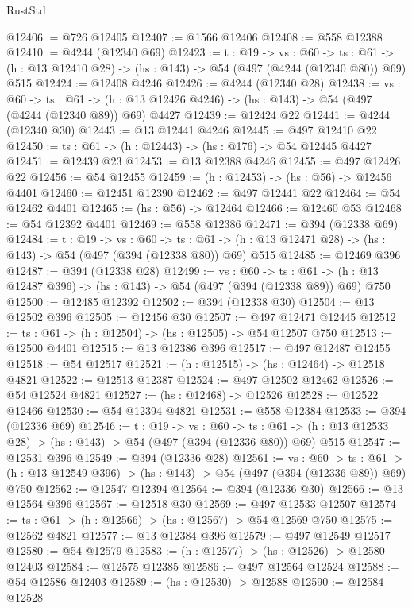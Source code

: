 \begin{lexlean}{RustStd}
\begin{coremodule}
@12406 := @726 @12405
@12407 := @1566 @12406
@12408 := @558 @12388
@12410 := @4244 (@12340 @69)
@12423 := {t : @19} ->
  {vs : @60} ->
  {ts : @61} -> (h : @13 @12410 @28) -> (hs : @143) -> @54 (@497 (@4244 (@12340 @80)) @69) @515
@12424 := @12408 @4246
@12426 := @4244 (@12340 @28)
@12438 := {vs : @60} ->
  {ts : @61} -> (h : @13 @12426 @4246) -> (hs : @143) -> @54 (@497 (@4244 (@12340 @89)) @69) @4427
@12439 := @12424 @22
@12441 := @4244 (@12340 @30)
@12443 := @13 @12441 @4246
@12445 := @497 @12410 @22
@12450 := {ts : @61} -> (h : @12443) -> (hs : @176) -> @54 @12445 @4427
@12451 := @12439 @23
@12453 := @13 @12388 @4246
@12455 := @497 @12426 @22
@12456 := @54 @12455
@12459 := (h : @12453) -> (hs : @56) -> @12456 @4401
@12460 := @12451 @12390
@12462 := @497 @12441 @22
@12464 := @54 @12462 @4401
@12465 := (hs : @56) -> @12464
@12466 := @12460 @53
@12468 := @54 @12392 @4401
@12469 := @558 @12386
@12471 := @394 (@12338 @69)
@12484 := {t : @19} ->
  {vs : @60} ->
  {ts : @61} -> (h : @13 @12471 @28) -> (hs : @143) -> @54 (@497 (@394 (@12338 @80)) @69) @515
@12485 := @12469 @396
@12487 := @394 (@12338 @28)
@12499 := {vs : @60} ->
  {ts : @61} -> (h : @13 @12487 @396) -> (hs : @143) -> @54 (@497 (@394 (@12338 @89)) @69) @750
@12500 := @12485 @12392
@12502 := @394 (@12338 @30)
@12504 := @13 @12502 @396
@12505 := @12456 @30
@12507 := @497 @12471 @12445
@12512 := {ts : @61} -> (h : @12504) -> (hs : @12505) -> @54 @12507 @750
@12513 := @12500 @4401
@12515 := @13 @12386 @396
@12517 := @497 @12487 @12455
@12518 := @54 @12517
@12521 := (h : @12515) -> (hs : @12464) -> @12518 @4821
@12522 := @12513 @12387
@12524 := @497 @12502 @12462
@12526 := @54 @12524 @4821
@12527 := (hs : @12468) -> @12526
@12528 := @12522 @12466
@12530 := @54 @12394 @4821
@12531 := @558 @12384
@12533 := @394 (@12336 @69)
@12546 := {t : @19} ->
  {vs : @60} ->
  {ts : @61} -> (h : @13 @12533 @28) -> (hs : @143) -> @54 (@497 (@394 (@12336 @80)) @69) @515
@12547 := @12531 @396
@12549 := @394 (@12336 @28)
@12561 := {vs : @60} ->
  {ts : @61} -> (h : @13 @12549 @396) -> (hs : @143) -> @54 (@497 (@394 (@12336 @89)) @69) @750
@12562 := @12547 @12394
@12564 := @394 (@12336 @30)
@12566 := @13 @12564 @396
@12567 := @12518 @30
@12569 := @497 @12533 @12507
@12574 := {ts : @61} -> (h : @12566) -> (hs : @12567) -> @54 @12569 @750
@12575 := @12562 @4821
@12577 := @13 @12384 @396
@12579 := @497 @12549 @12517
@12580 := @54 @12579
@12583 := (h : @12577) -> (hs : @12526) -> @12580 @12403
@12584 := @12575 @12385
@12586 := @497 @12564 @12524
@12588 := @54 @12586 @12403
@12589 := (hs : @12530) -> @12588
@12590 := @12584 @12528

\end{coremodule}
\end{lexlean}
